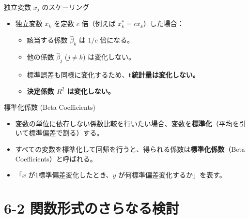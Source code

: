 \documentclass[
  ignorenonframetext,
]{beamer}
\providecommand{\tightlist}{%
  \setlength{\itemsep}{0pt}\setlength{\parskip}{0pt}}
\begin{document}
\begin{frame}{独立変数 \(x_j\) のスケーリング}
\protect\hypertarget{ux72ecux7acbux5909ux6570-x_j-ux306eux30b9ux30b1ux30fcux30eaux30f3ux30b0}{}
\begin{itemize}
\tightlist
\item
  独立変数 \(x_k\) を定数 \(c\) 倍（例えば \(x_k^* = cx_k\)）した場合：

  \begin{itemize}
  \tightlist
  \item
    該当する係数 \(\hat{\beta}_k\) は \(1/c\) 倍になる。
  \item
    他の係数 \(\hat{\beta}_j\) (\(j \neq k\)) は変化しない。
  \item
    標準誤差も同様に変化するため、\textbf{t統計量は変化しない。}
  \item
    \textbf{決定係数 \(R^2\) は変化しない。}
  \end{itemize}
\end{itemize}
\end{frame}

\begin{frame}{標準化係数 (Beta Coefficients)}
\protect\hypertarget{ux6a19ux6e96ux5316ux4fc2ux6570-beta-coefficients}{}
\begin{itemize}
\tightlist
\item
  変数の単位に依存しない係数比較を行いたい場合、変数を\textbf{標準化}（平均を引いて標準偏差で割る）する。
\item
  すべての変数を標準化して回帰を行うと、得られる係数は\textbf{標準化係数}（Beta
  Coefficients）と呼ばれる。
\item
  「\(x\) が1標準偏差変化したとき、\(y\)
  が何標準偏差変化するか」を表す。
\end{itemize}
\end{frame}

\hypertarget{ux95a2ux6570ux5f62ux5f0fux306eux3055ux3089ux306aux308bux691cux8a0e}{%
\section{6-2
関数形式のさらなる検討}\label{ux95a2ux6570ux5f62ux5f0fux306eux3055ux3089ux306aux308bux691cux8a0e}}
\end{document}
